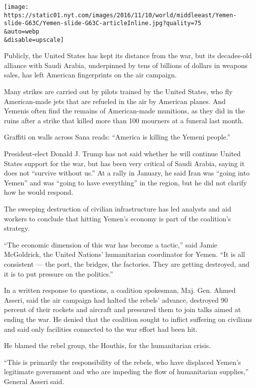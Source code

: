 \texttt{[image: https://static01.nyt.com/images/2016/11/10/world/middleeast/Yemen-slide-G63C/Yemen-slide-G63C-articleInline.jpg?quality=75\\\&auto=webp\\\&disable=upscale]}

Publicly, the United States has kept its distance from the war, but its
decades-old alliance with Saudi Arabia, underpinned by tens of billions
of dollars in weapons sales, has left American fingerprints on the air
campaign.

Many strikes are carried out by pilots trained by the United States, who
fly American-made jets that are refueled in the air by American planes.
And Yemenis often find the remains of American-made munitions, as they
did in the ruins after a strike that killed more than 100 mourners at a
funeral last month.

Graffiti on walls across Sana reads: ``America is killing the Yemeni
people.''

President-elect Donald J. Trump has not said whether he will continue
United States support for the war, but has been very critical of Saudi
Arabia, saying it does not ``survive without us.'' At a rally in
January, he said Iran was ``going into Yemen'' and was ``going to have
everything'' in the region, but he did not clarify how he would respond.

The sweeping destruction of civilian infrastructure has led analysts and
aid workers to conclude that hitting Yemen's economy is part of the
coalition's strategy.

``The economic dimension of this war has become a tactic,'' said Jamie
McGoldrick, the United Nations' humanitarian coordinator for Yemen. ``It
is all consistent --- the port, the bridges, the factories. They are
getting destroyed, and it is to put pressure on the politics.''

In a written response to questions, a coalition spokesman, Maj. Gen.
Ahmed Asseri, said the air campaign had halted the rebels' advance,
destroyed 90 percent of their rockets and aircraft and pressured them to
join talks aimed at ending the war. He denied that the coalition sought
to inflict suffering on civilians and said only facilities connected to
the war effort had been hit.

He blamed the rebel group, the Houthis, for the humanitarian crisis.

``This is primarily the responsibility of the rebels, who have displaced
Yemen's legitimate government and who are impeding the flow of
humanitarian supplies,'' General Asseri said.

